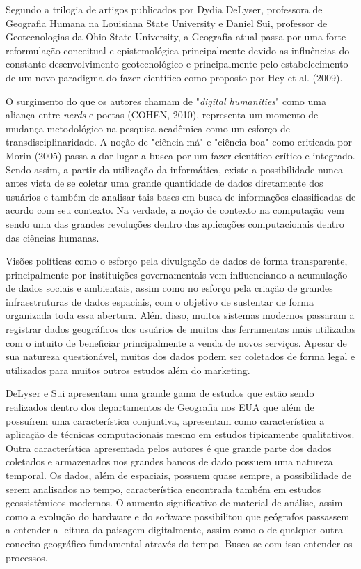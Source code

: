 Segundo a trilogia de artigos publicados por Dydia DeLyser, professora de Geografia Humana na Louisiana State University e Daniel Sui, professor de Geotecnologias da Ohio State University, a Geografia atual passa por uma forte reformulação conceitual e epistemológica principalmente devido as influências do constante desenvolvimento geotecnológico e principalmente pelo estabelecimento de um novo paradigma do fazer científico como proposto por Hey et al. (2009)\cite{HEY_etal09}.

O surgimento do que os autores chamam de "\textit{digital humanities}" como uma aliança entre \textit{nerds} e poetas (COHEN, 2010)\cite{COHEN}, representa um momento de mudança metodológico na pesquisa acadêmica como um esforço de transdisciplinaridade. A noção de "ciência má" e "ciência boa" como criticada por Morin (2005)\cite{MORIN} passa a dar lugar a busca por um fazer científico crítico e integrado. Sendo assim, a partir da utilização da informática, existe a possibilidade nunca antes vista de se coletar uma grande quantidade de dados diretamente dos usuários e também de analisar tais bases em busca de informações classificadas de acordo com seu contexto. Na verdade, a noção de contexto na computação vem sendo uma das grandes revoluções dentro das aplicações computacionais dentro das ciências humanas.

Visões políticas como o esforço pela divulgação de dados de forma transparente, principalmente por instituições governamentais vem influenciando a acumulação de dados sociais e ambientais, assim como no esforço pela criação de grandes infraestruturas de dados espaciais, com o objetivo de sustentar de forma organizada toda essa abertura. Além disso, muitos sistemas modernos passaram a registrar dados geográficos dos usuários de muitas das ferramentas mais utilizadas com o intuito de beneficiar principalmente a venda de novos serviços. Apesar de sua natureza questionável, muitos dos dados podem ser coletados de forma legal e utilizados para muitos outros estudos além do marketing.  

DeLyser e Sui apresentam uma grande gama de estudos que estão sendo realizados dentro dos departamentos de Geografia nos EUA que além de possuírem uma característica conjuntiva, apresentam como característica a aplicação de técnicas computacionais mesmo em estudos tipicamente qualitativos. Outra característica apresentada pelos autores é que grande parte dos dados coletados e armazenados nos grandes bancos de dado possuem uma natureza temporal. Os dados, além de espaciais, possuem quase sempre, a possibilidade de serem analisados no tempo, característica encontrada também em estudos geossistêmicos modernos. O aumento significativo de material de análise, assim como a evolução do hardware e do software possibilitou que geógrafos passassem a entender a leitura da paisagem digitalmente, assim como o de qualquer outra conceito geográfico fundamental através do tempo. Busca-se com isso entender os processos.

